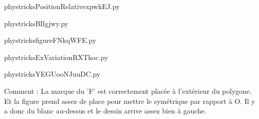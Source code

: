     

    \clearpage
    


    \newcommand{\CaptionFigPositionRelativexpwkEJ}{<+Type your caption here+>}
    \begin{center}
        
    \end{center}
    phystricksPositionRelativexpwkEJ.py

    

    \clearpage
    


    \newcommand{\CaptionFigBIlgjwy}{<+Type your caption here+>}
    \begin{center}
        
    \end{center}
    phystricksBIlgjwy.py

    

    \clearpage
    


    \newcommand{\CaptionFigfigureFNkqWFE}{<+Type your caption here+>}
    \begin{center}
        
    \end{center}
    phystricksfigureFNkqWFE.py

    

    \clearpage
    


    \newcommand{\CaptionFigExVariationRXTkoc}{<+Type your caption here+>}
    \begin{center}
        
    \end{center}
    phystricksExVariationRXTkoc.py

    

    \clearpage
    


    \newcommand{\CaptionFigYEGUooNJuuDC}{<+Type your caption here+>}
    \begin{center}
        
    \end{center}
    phystricksYEGUooNJuuDC.py

    Comment : La marque du 'F' est correctement placée à l'extérieur du polygone. 
 Et la figure prend assez de place pour mettre le symétrique par rapport à O. Il y a donc du blanc au-dessus et le dessin arrive assez bien à gauche.

